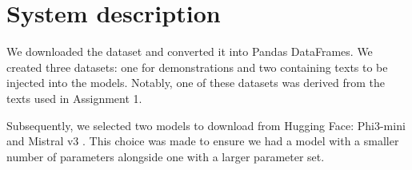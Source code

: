 \documentclass[11pt]{article}
\begin{document}





\section{System description}
\label{sec:system}
We downloaded the dataset and converted it into Pandas DataFrames. We created three datasets: one for demonstrations and two containing texts to be injected into the models. Notably, one of these datasets was derived from the texts used in Assignment 1.

Subsequently, we selected two models to download from Hugging Face: Phi3-mini \cite{arXiv.2404.14219} and Mistral v3 \cite{arXiv:2310.06825}. This choice was made to ensure we had a model with a smaller number of parameters alongside one with a larger parameter set.

\end{document}
